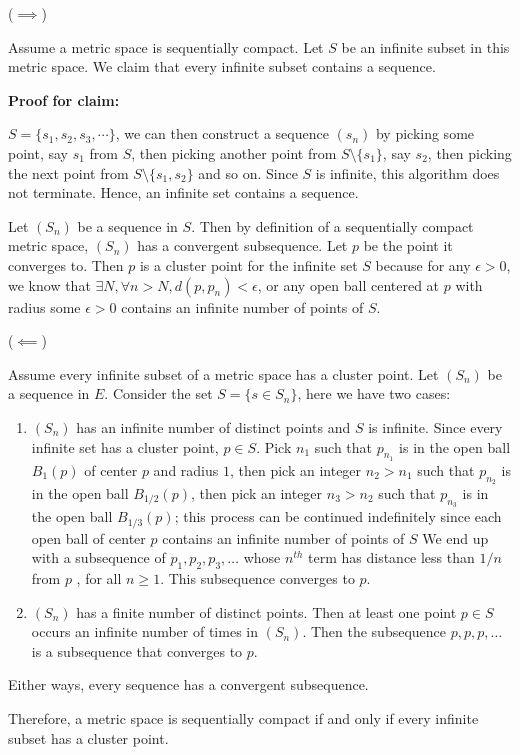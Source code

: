 \documentclass[12pt]{article}
\begin{document}
\begin{solution}
    \bbni

    ($\implies$)

    Assume a metric space is sequentially compact. Let $S$ be an infinite subset in this metric space. We claim that every infinite subset contains a sequence. 

    \textbf{Proof for claim:} 

    $S = \{s_1, s_2, s_3, \cdots \}$, we can then construct a sequence $(s_n)$ by picking some point, say $s_1$ from $S$, then picking another point from $S \setminus \{s_1\}$, say $s_2$, then picking the next point from $S \setminus \{s_1, s_2\}$ and so on. Since $S$ is infinite, this algorithm does not terminate. Hence, an infinite set contains a sequence. 

    Let $(S_n)$ be a sequence in $S$. Then by definition of a sequentially compact metric space, $(S_n)$ has a convergent subsequence. Let $p$ be the point it converges to. Then $p$ is a cluster point for the infinite set $S$ because for any $\epsilon > 0$, we know that $\exists N, \forall n > N, d(p, p_n) < \epsilon$, or any open ball centered at $p$ with radius some $\epsilon > 0$ contains an infinite number of points of $S$.  

    \bbni

    ($\impliedby$)

    Assume every infinite subset of a metric space has a cluster point. Let $(S_n)$ be a sequence in $E$. Consider the set $S = \{s \in S_n\}$, here we have two cases: 
    \begin{enumerate}
        \item $(S_n)$ has an infinite number of distinct points and $S$ is infinite. 
        Since every infinite set has a cluster point, $p \in S$. Pick $n_1$ such that $p_{n_1}$ is in the open ball $B_1(p)$ of center $p$ and radius $1$, then pick an integer $n_2 > n_1$ such that $p_{n_2}$ is in the open ball $B_{1/2}(p)$, then pick an integer $n_3 > n_2$ such that $p_{n_3}$ is in the open ball $B_{1/3}(p)$; this process can be continued indefinitely since each open ball of center $p$ contains an infinite number of points of $S$ We end up with a subsequence of $p_1, p_2, p_3, \ldots$ whose $n^{th}$ term has distance less than $1/n $ from $p$ , for all $n \geq 1$. This subsequence converges to $p$.

        \item $(S_n)$ has a finite number of distinct points. Then at least one point $p \in S$ occurs an infinite number of times in $(S_n)$. Then the subsequence $p, p, p, \ldots$ is a subsequence that converges to $p$.   
    \end{enumerate}

    Either ways, every sequence has a convergent subsequence. 

    Therefore, a metric space is sequentially compact if and only if every infinite subset has a cluster point. 
\end{solution}
\end{document}
